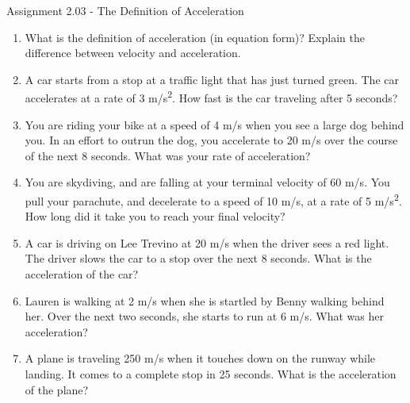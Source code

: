 \documentclass[letterpaper, 12pt]{article}
\begin{document}


\begin{center} Assignment 2.03 - The Definition of Acceleration
\end{center}





\begin{enumerate}
\item What is the definition of acceleration (in equation form)?  Explain the difference between velocity and acceleration.  
\vspace{1in}
\item A car starts from a stop at a traffic light that has just turned green.  The car accelerates at a rate of 3 m/s\textsuperscript{2}.  How fast is the car traveling after 5 seconds?
\vspace{1in}
\item You are riding your bike at a speed of 4 m/s when you see a large dog behind you.  In an effort to outrun the dog, you accelerate to 20 m/s over the course of the next 8 seconds.  What was your rate of acceleration?
\vspace{1in}
\item You are skydiving, and are falling at your terminal velocity of 60 m/s.  You pull your parachute, and decelerate to a speed of 10 m/s, at a rate of 5 m/s\textsuperscript{2}.  How long did it take you to reach your final velocity?
\vspace{1in}
\item A car is driving on Lee Trevino at 20 m/s when the driver sees a red light.  The driver slows the car to a stop over the next 8 seconds.  What is the acceleration of the car?
\vspace{1.5in}
\item Lauren is walking at 2 m/s when she is startled by Benny walking behind her. Over the next two seconds, she starts to run at 6 m/s. What was her acceleration?
\vspace{1in}
\item A plane is traveling 250 m/s when it touches down on the runway while landing.  It comes to a complete stop in 25 seconds.  What is the acceleration of the plane?

\end{enumerate}
\end{document}
